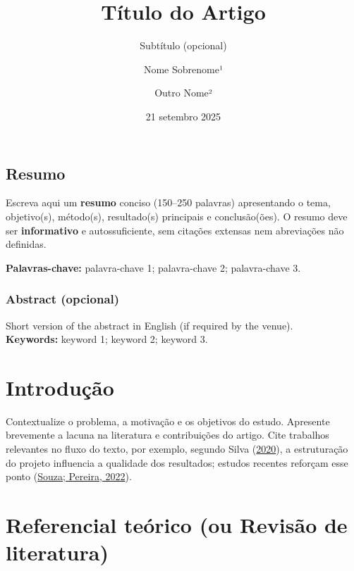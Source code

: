 \documentclass[
  12pt,
  a4paper,
]{scrartcl}
\title{Título do Artigo}
\subtitle{Subtítulo (opcional)}
\author{Nome Sobrenome¹ \and Outro Nome²}
\date{21 setembro 2025}
\begin{document}
\maketitle

\renewcommand*\contentsname{Sumário}
{
\setcounter{tocdepth}{2}
\tableofcontents
}
\hypertarget{resumo}{%
\subsection{Resumo}\label{resumo}}

Escreva aqui um \textbf{resumo} conciso (150--250 palavras) apresentando
o tema, objetivo(s), método(s), resultado(s) principais e
conclusão(ões). O resumo deve ser \textbf{informativo} e
autossuficiente, sem citações extensas nem abreviações não definidas.

\textbf{Palavras-chave:} palavra-chave 1; palavra-chave 2; palavra-chave
3.

\hypertarget{abstract-opcional}{%
\subsubsection{Abstract (opcional)}\label{abstract-opcional}}

Short version of the abstract in English (if required by the venue).\\
\textbf{Keywords:} keyword 1; keyword 2; keyword 3.

\hypertarget{introduuxe7uxe3o}{%
\section{Introdução}\label{introduuxe7uxe3o}}

Contextualize o problema, a motivação e os objetivos do estudo.
Apresente brevemente a lacuna na literatura e contribuições do artigo.
Cite trabalhos relevantes no fluxo do texto, por exemplo, segundo Silva
(\protect\hyperlink{ref-silva2020}{2020}), a estruturação do projeto
influencia a qualidade dos resultados; estudos recentes reforçam esse
ponto (\protect\hyperlink{ref-souza2022}{Souza; Pereira, 2022}).

\hypertarget{referencial-teuxf3rico-ou-revisuxe3o-de-literatura}{%
\section{Referencial teórico (ou Revisão de
literatura)}\label{referencial-teuxf3rico-ou-revisuxe3o-de-literatura}}
\end{document}
